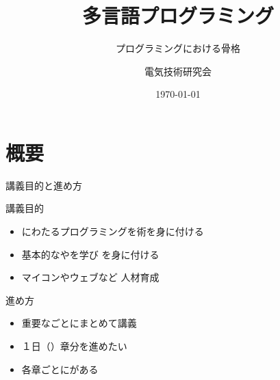 \documentclass[dvipdfmx]{beamer}
\title{多言語プログラミング}
\subtitle{プログラミングにおける骨格}
\author[電研]{電気技術研究会}
\institute[NITNC]{NIT, Nara Collage}
\date[\today]{\today}
\begin{document}
\begin{frame}[plain]
  \titlepage
\end{frame}

\section*{概要}
  \begin{frame}
    \sectionpage
  \end{frame}
  \begin{frame}{講義目的と進め方}
    \begin{large}講義目的\end{large}
    \begin{itemize}
      \setlength{\itemsep}{5mm}
      \item {}にわたるプログラミングを術を身に付ける
      \item 基本的なやを学び を身に付ける
      \item マイコンやウェブなど 人材育成
    \end{itemize}
    \vfill
    \begin{large}進め方\end{large}
    \begin{itemize}
      \setlength{\itemsep}{5mm}
      \item 重要なごとにまとめて講義
      \item １日（）章分を進めたい
      \item 各章ごとにがある
    \end{itemize}
  \end{frame}
\end{document}
